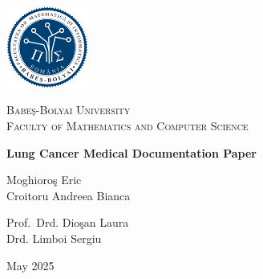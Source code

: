 \documentclass[a4paper,12pt]{article}
\begin{document}

\pagestyle{fancy}
\fancyhf{} %

\fancyhead[C]{\nouppercase{\leftmark}} %
\fancyfoot[C]{\thepage}                %

\renewcommand{\sectionmark}[1]{\markboth{#1}{}} %


\begin{titlepage}
    \centering

    \includegraphics[width=0.2\textwidth]{../assets/main/ubb.png}\par\vspace{0.5cm} %

    {\scshape\large Babe\c{s}-Bolyai University\\Faculty of Mathematics and Computer Science\par}
    \vspace{2.0cm}

    {\huge\bfseries Lung Cancer Medical Documentation Paper\par}
    \vspace{2.0cm}

    {\Large Moghioro\c{s} Eric \\ Croitoru Andreea Bianca\par}
    \vspace{0.5cm}

    \vfill

    \noindent
    \begin{minipage}[t]{0.48\textwidth}
        \raggedright
        {\large Prof.\ Drd. Dio\c{s}an Laura \\ Drd. Limboi Sergiu}
    \end{minipage}%
    \hfill
    \begin{minipage}[t]{0.48\textwidth}
        \raggedleft
        {\large May 2025}
    \end{minipage}
\end{titlepage}
\end{document}
